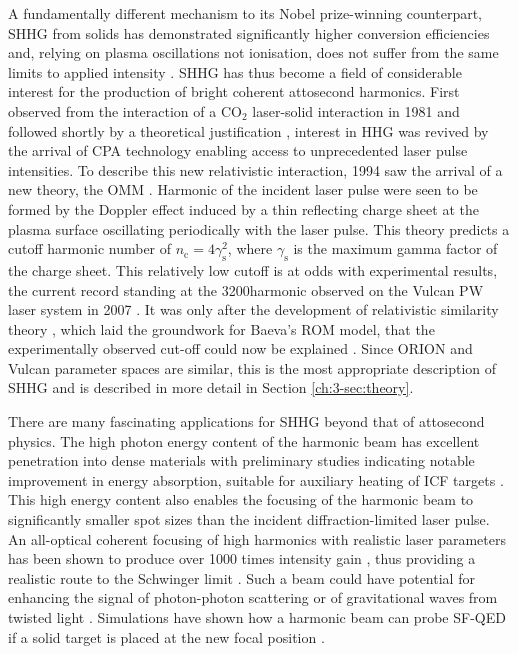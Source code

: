 A fundamentally different mechanism to its Nobel prize-winning counterpart, SHHG from solids has demonstrated significantly higher conversion efficiencies and, relying on plasma oscillations not ionisation, does not suffer from the same limits to applied intensity \cite{teubnerHighorderHarmonicsLaserirradiated2009}. SHHG has thus become a field of considerable interest for the production of bright coherent attosecond harmonics. First observed from the interaction of a CO$_2$ laser-solid interaction in 1981 \cite{carmanVisibleHarmonicEmission1981} and followed shortly by a theoretical justification \cite{bezzeridesPlasmaMechanismUltraviolet1982}, interest in HHG was revived by the arrival of CPA technology enabling access to unprecedented laser pulse intensities. To describe this new relativistic interaction, 1994 saw the arrival of a new theory, the \ac{OMM} \cite{bulanovInteractionUltrashortRelativistically1994}. Harmonic of the incident laser pulse were seen to be formed by the Doppler effect induced by a thin reflecting charge sheet at the plasma surface oscillating periodically with the laser pulse. This theory predicts a cutoff harmonic number of $n_\mathrm{c} = 4\gamma_\mathrm{s}^2 $, where $\gamma_\mathrm{s}$ is the maximum gamma factor of the charge sheet. This relatively low cutoff is at odds with experimental results, the current record standing at the 3200\th harmonic observed on the Vulcan PW laser system in 2007 \cite{dromeyBrightMultikeVHarmonic2007}. It was only after the development of relativistic similarity theory \cite{gordienkoScalingsUltrarelativisticLaser2005}, which laid the groundwork for Baeva's ROM model, that the experimentally observed cut-off could now be explained \cite{baevaTheoryHighorderHarmonic2006}. Since ORION and Vulcan parameter spaces are similar, this is the most appropriate description of SHHG and is described in more detail in Section \ref{ch:3-sec:theory}.

There are many fascinating applications for SHHG beyond that of attosecond physics. The high photon energy content of the harmonic beam has excellent penetration into dense materials with preliminary studies indicating notable improvement in energy absorption, suitable for auxiliary heating of ICF targets \cite{paddockEnergyGainWettedfoam2024}. This high energy content also enables the focusing of the harmonic beam to significantly smaller spot sizes than the incident diffraction-limited laser pulse. An all-optical coherent focusing of high harmonics with realistic laser parameters has been shown to produce over 1000 times intensity gain \cite{vincentiAchievingExtremeLight2019}, thus providing a realistic route to the Schwinger limit \cite{quereReflectingPetawattLasers2021}. Such a beam could have potential for enhancing the signal of photon-photon scattering \cite{aboushelbayaOrbitalAngularMomentum2019} or of gravitational waves from twisted light \cite{atongaGravitationalWavesHighpower2023}. Simulations have shown how a harmonic beam can probe \ac{SF-QED} if a solid target is placed at the new focal position \cite{fedeliProbingStrongfieldQED2020}.

